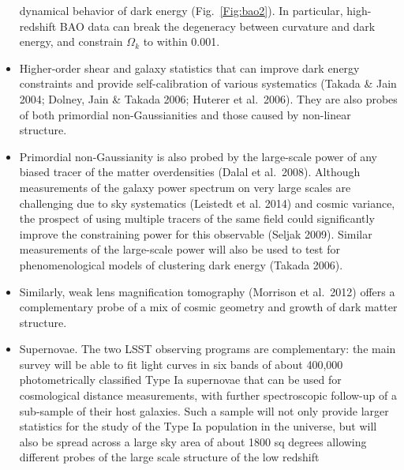 \begin{itemize}
dynamical behavior of dark energy (Fig.~\ref{Fig:bao2}). In particular, high-redshift BAO data can break
the degeneracy between curvature and dark energy, and constrain $\Omega_k$ to within
0.001.
\item Higher-order shear and galaxy statistics that can improve dark energy
constraints and provide self-calibration of various systematics (Takada \& Jain 2004;
Dolney, Jain \& Takada 2006; Huterer et al.~2006). They are also probes of both
primordial non-Gaussianities and those caused by non-linear structure.
\item Primordial non-Gaussianity is also probed by the large-scale power of any biased tracer of the matter
overdensities (Dalal et al.~2008). Although measurements of the galaxy power spectrum on very large scales
are challenging due to sky systematics (Leistedt et al. 2014) and cosmic variance, the prospect of using
multiple tracers of the same field could significantly improve the constraining power for this observable
(Seljak 2009). Similar measurements of the large-scale power will also be used to test for phenomenological
models of clustering dark energy (Takada 2006).
\item Similarly, weak lens magnification tomography (Morrison et al.~2012) offers a
complementary probe of a mix of cosmic geometry and growth of dark matter structure.
\item Supernovae. The two LSST observing programs are complementary: the main survey will
be able to fit light curves in six bands of about 400,000 photometrically classified Type
Ia supernovae that can be used for cosmological distance measurements, with further spectroscopic
 follow-up of a sub-sample of their host galaxies. Such a sample will not only provide larger statistics
 for the study of the Type Ia population in the universe, but will also be spread across a large sky
 area of about 1800 sq degrees allowing different probes of the large scale structure of the low redshift

\end{itemize}
